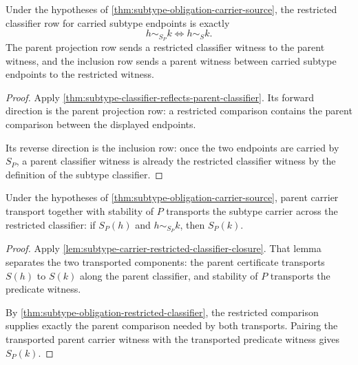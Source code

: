 \begin{theorem}
\label{thm:subtype-obligation-restricted-classifier}
Under the hypotheses of \autoref{thm:subtype-obligation-carrier-source}, the restricted classifier row for carried subtype endpoints is exactly
$$
h\sim_{S_P}k\Longleftrightarrow h\sim_S k.
$$
The parent projection row sends a restricted classifier witness to the parent witness, and the inclusion row sends a parent witness between carried subtype endpoints to the restricted witness.
\end{theorem}
\begin{proof}
Apply \autoref{thm:subtype-classifier-reflects-parent-classifier}. Its forward direction is the parent projection row: a restricted comparison contains the parent comparison between the displayed endpoints.

Its reverse direction is the inclusion row: once the two endpoints are carried by $S_P$, a parent classifier witness is already the restricted classifier witness by the definition of the subtype classifier.
\end{proof}

\begin{theorem}
\label{thm:subtype-obligation-predicate-transport}
Under the hypotheses of \autoref{thm:subtype-obligation-carrier-source}, parent carrier transport together with stability of $P$ transports the subtype carrier across the restricted classifier: if $S_P(h)$ and $h\sim_{S_P}k$, then $S_P(k)$.
\end{theorem}
\begin{proof}
Apply \autoref{lem:subtype-carrier-restricted-classifier-closure}. That lemma separates the two transported components: the parent certificate transports $S(h)$ to $S(k)$ along the parent classifier, and stability of $P$ transports the predicate witness.

By \autoref{thm:subtype-obligation-restricted-classifier}, the restricted comparison supplies exactly the parent comparison needed by both transports. Pairing the transported parent carrier witness with the transported predicate witness gives $S_P(k)$.
\end{proof}


